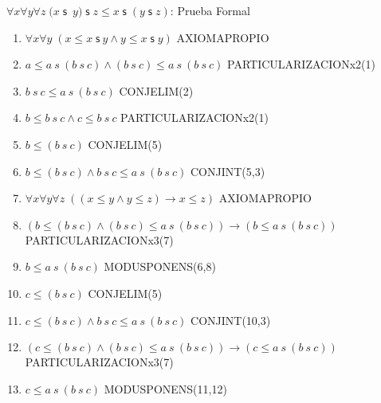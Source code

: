 \documentclass[10pt]{beamer}
\newcounter{saveenumi}
\newcommand{\seti}{\setcounter{saveenumi}{\value{enumi}}}
\newcommand{\Cfonta}{\fontsize{6.7}{9.5}\selectfont}
\newcommand{\Nand}{\wedge}
\newcommand{\trans}{\forall x\forall y\forall z\;\left( (x\leq y\wedge
y\leq z)\rightarrow x\leq z\right)}
\newcommand{\sCot}{\forall x\forall y\;(x\leq x\;\mathsf{s}\ y\wedge y\leq x\;\mathsf{s}\;y)}
\newcommand{\assoc}{\forall x\forall y\forall
z\;(x\;\mathsf{s}$\ $y)\;\mathsf{s}\;z\leq x\;\mathsf{s}\;(y\;\mathsf{s}\;z)}
\begin{document}
\begin{frame}{$\assoc$: Prueba Formal}
\Cfonta
  \begin{enumerate}[<+->]
    \item $ \sCot $ \hfill AXIOMAPROPIO
    \item $ a \leq a\ s\ (b\ s\ c)\Nand (b\ s\ c)\leq a\ s\ (b\ s\ c) $ \hfill PARTICULARIZACIONx2(1)
    \item $ b\ s\ c \leq a\ s\ (b\ s\ c)$ \hfill CONJELIM(2)
    \item $ b \leq b\ s\ c \Nand c \leq b\ s\ c $ \hfill PARTICULARIZACIONx2(1)
    \item $ b \leq (b\ s\ c)$ \hfill CONJELIM(5)
    \item $ b \leq (b\ s\ c) \Nand b\ s\ c \leq a\ s\ (b\ s\ c)$ \hfill CONJINT(5,3)
    \item $ \trans $ \hfill AXIOMAPROPIO
    \item $ (b \leq (b\ s\ c) \Nand (b\ s\ c) \leq a\ s\ (b\ s\ c)) \rightarrow (b \leq a\ s\ (b\ s\ c))$ \hfill PARTICULARIZACIONx3(7)
    \item $ b \leq a\ s\ (b\ s\ c) $ \hfill MODUSPONENS(6,8)
    \item $ c \leq (b\ s\ c)$ \hfill CONJELIM(5)
    \item $ c \leq (b\ s\ c) \Nand  b\ s\ c \leq a\ s\ (b\ s\ c) $ \hfill CONJINT(10,3)
    \item $ (c \leq (b\ s\ c) \Nand (b\ s\ c) \leq a\ s\ (b\ s\ c)) \rightarrow (c \leq a\ s\ (b\ s\ c))$ \hfill PARTICULARIZACIONx3(7)
    \item $ c \leq a\ s\ (b\ s\ c) $ \hfill MODUSPONENS(11,12)
    \seti
  \end{enumerate}


  \setcounter{equation}{0}

\end{frame}
\end{document}
